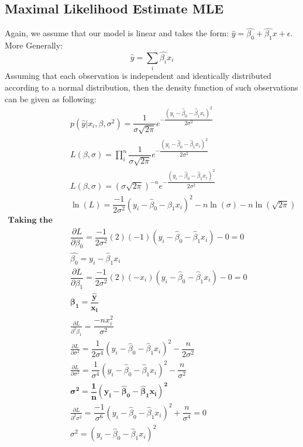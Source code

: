 \documentclass[12pt,a4paper]{report}
\begin{document}
\subsection{Maximal Likelihood Estimate MLE }
Again, we assume that our model is linear and takes the form: $\hat{y}=\hat{\beta_{0}}+\hat{\beta_{1}}x + \epsilon$. \\
More Generally:  \[
\hat{y}= \sum_{i} \hat{\beta_{i}}x_{i}
\]
Assuming that each observation is independent and identically distributed according to a normal distribution, then the density function of such observations can be given as following:
\begin{align*}
&p(\hat{y}| x_{i}, \beta, \sigma^{2})= \dfrac{1}{\sigma \sqrt{2\pi}} e^{-\dfrac{(y_{i}-\hat{\beta}_{0}-\hat{\beta}_{1}x_{i})^{2}}{2\sigma^{2}}}\\
&L(\beta, \sigma) =\prod_{i}^{n} \dfrac{1}{\sigma \sqrt{2\pi}} e^{-\dfrac{(y_{i}-\hat{\beta}_{0}-\hat{\beta}_{1}x_{i})^{2}}{2\sigma^{2}}} \\
&L(\beta, \sigma) = (\sigma \sqrt{2\pi})^{-n} e^{- \dfrac{(y_{i}-\hat{\beta}_{0}-\hat{\beta}_{1}x_{i})^{2}}{2\sigma^{2}}} \\
&\ln (L) = \dfrac{-1}{2\sigma^{2}} (y_{i}-\hat{\beta}_{0}-\hat{\beta}_{1}x_{i})^{2} - n\ln(\sigma) -n\ln(\sqrt{2\pi})\\
\textbf{Taking the first and second derivative } \\
&\dfrac{\partial L}{\partial \beta_{0}}= \dfrac{-1}{2\sigma^{2}} (2)(-1)(y_{i}-\hat{\beta}_{0}-\hat{\beta}_{1}x_{i}) -0=0\\
&\hat{\beta_{0}}=y_{i}-\hat{\beta}_{1}x_{i}\\
&\dfrac{\partial L}{\partial \beta_{1}}= \dfrac{-1}{2\sigma^{2}} (2)(-x_{i})(y_{i}-\hat{\beta}_{0}-\hat{\beta}_{1}x_{i}) -0=0\\
& \mathbf{\beta_{1} = \dfrac{\hat{y}}{x_{i}} }\\
&\frac{\partial L}{\partial^{2} \beta_{1}}=  \dfrac{-n x_{i}^{2} }{\sigma^{2}}\\
&\frac{\partial L}{\partial \sigma^{2}} = \dfrac{1}{2\sigma^{4}} (y_{i}-\hat{\beta}_{0}-\hat{\beta}_{1}x_{i})^{2} -\dfrac{n}{2\sigma^{2}}\\
&\frac{\partial L}{\partial \sigma^{2}} = \dfrac{1}{\sigma^{4}} (y_{i}-\hat{\beta}_{0}-\hat{\beta}_{1}x_{i})^{2} -\dfrac{n}{\sigma^{2}}\\
&\mathbf{\sigma^{2}= \dfrac{1}{n} (y_{i}-\hat{\beta}_{0}-\hat{\beta}_{1}x_{i})^{2}}\\
&\frac{\partial L}{\partial^{2} \sigma^{2}} =  \dfrac{-1}{\sigma^{6}} (y_{i}-\hat{\beta}_{0}-\hat{\beta}_{1}x_{i})^{2} +\dfrac{n}{\sigma^{4}}=0\\
&\sigma^{2}=(y_{i}-\hat{\beta}_{0}-\hat{\beta}_{1}x_{i})^{2} 
\end{align*}
\end{document}
